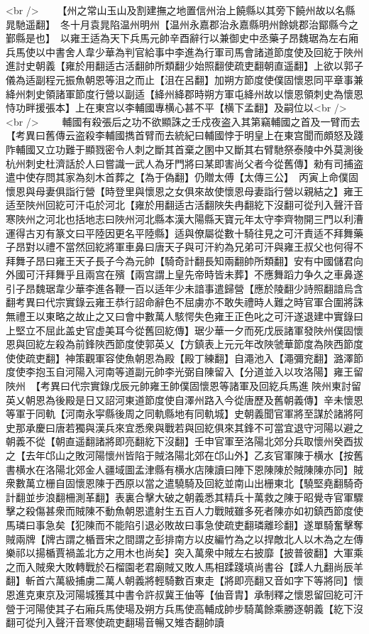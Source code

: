 <br />
　　【州之常山玉山及割建撫之地置信州治上饒縣以其旁下饒州故以名縣晁馳遥翻】　冬十月袁晁陷温州明州【温州永嘉郡治永嘉縣明州餘姚郡治鄮縣今之鄞縣是也】　以雍王适為天下兵馬元帥辛酉辭行以兼御史中丞藥子昂魏琚為左右廂兵馬使以中書舍人韋少華為判官給事中李進為行軍司馬會諸道節度使及回紇于陜州進討史朝義【雍於用翻适古活翻帥所類翻少始照翻使疏吏翻朝直遥翻】上欲以郭子儀為适副程元振魚朝恩等沮之而止【沮在呂翻】加朔方節度使僕固懷恩同平章事兼絳州刺史領諸軍節度行營以副适【絳州絳郡時朔方軍屯絳州故以懷恩領刺史為懷恩恃功畔援張本】上在東宫以李輔國專横心甚不平【横下孟翻】及嗣位以<br />
<br />
　　輔國有殺張后之功不欲顯誅之壬戍夜盗入其第竊輔國之首及一臂而去　【考異曰舊傳云盗殺李輔國擕首臂而去統紀曰輔國悖于明皇上在東宫聞而頗怒及踐阼輔國又立功難于顯戮密令人刺之斷其首棄之圂中又斷其右臂馳祭泰陵中外莫測後杭州刺史杜濟話於人曰嘗識一武人為牙門將曰某即害尚父者今從舊傳】勑有司捕盗遣中使存問其家為刻木首葬之【為于偽翻】仍贈太傅【太傳三公】　丙寅上命僕固懷恩與母妻俱詣行營【時登里與懷恩之女俱來故使懷恩母妻詣行營以親結之】雍王适至陜州回紇可汗屯於河北【雍於用翻适古活翻陜失冉翻紇下沒翻可從刋入聲汗音寒陜州之河北也括地志曰陜州河北縣本漢大陽縣天寶元年太守李齊物開三門以利漕運得古刃有篆文曰平陸因更名平陸縣】适與僚屬從數十騎往見之可汗責适不拜舞藥子昂對以禮不當然回紇將軍車鼻曰唐天子與可汗約為兄弟可汗與雍王叔父也何得不拜舞子昂曰雍王天子長子今為元帥【騎奇計翻長知兩翻帥所類翻】安有中國儲君向外國可汗拜舞乎且兩宫在殯【兩宫謂上皇先帝時皆未葬】不應舞蹈力争久之車鼻遂引子昂魏琚韋少華李進各鞭一百以适年少未諳事遣歸營【應於陵翻少詩照翻諳烏含翻考異曰代宗實錄云雍王恭行詔命辭色不屈虜亦不敢失禮時人難之時官軍合圍將誅無禮王以東略之故止之又曰會中數萬人駭愕失色雍王正色叱之可汗遂退建中實錄曰上堅立不屈此盖史官虚美耳今從舊回紇傳】琚少華一夕而死戊辰諸軍發陜州僕固懷恩與回紇左殺為前鋒陜西節度使郭英乂【方鎮表上元元年改陜虢華節度為陜西節度使使疏吏翻】神策觀軍容使魚朝恩為殿【殿丁練翻】自澠池入【澠彌兖翻】潞澤節度使李抱玉自河陽入河南等道副元帥李光弼自陳留入【分道並入以攻洛陽】雍王留陜州　【考異曰代宗實錄戊辰元帥雍王帥僕固懷恩等諸軍及回紇兵馬進陜州東討留英乂朝恩為後殿是日又詔河東道節度使自澤州路入今從唐歷及舊朝義傳】辛未懷恩等軍于同軌【河南永寜縣後周之同軌縣地有同軌城】史朝義聞官軍將至謀於諸將阿史那承慶曰唐若獨與漢兵來宜悉衆與戰若與回紇俱來其鋒不可當宜退守河陽以避之朝義不從【朝直遥翻諸將即亮翻紇下沒翻】壬申官軍至洛陽北郊分兵取懷州癸酉拔之【去年邙山之敗河陽懷州皆陷于賊洛陽北郊在邙山外】乙亥官軍陳于横水【按舊書横水在洛陽北郊金人疆域圖孟津縣有横水店陳讀曰陣下恩陳陳於賊陳陳亦同】賊衆數萬立栅自固懷恩陳于西原以當之遣驍騎及回紇並南山出栅東北【驍堅堯翻騎奇計翻並步浪翻柵測革翻】表裏合擊大破之朝義悉其精兵十萬救之陳于昭覺寺官軍驟擊之殺傷甚衆而賊陳不動魚朝恩遣射生五百人力戰賊雖多死者陳亦如初鎮西節度使馬璘曰事急矣【犯陳而不能陷引退必敗故曰事急使疏吏翻璘離珍翻】遂單騎奮擊奪賊兩牌【牌古謂之楯晋宋之間謂之彭排南方以皮編竹為之以捍敵北人以木為之左傳樂祁以揚楯賈禍盖北方之用木也尚矣】突入萬衆中賊左右披靡【披普彼翻】大軍乘之而入賊衆大敗轉戰於石榴園老君廟賊又敗人馬相蹂踐填尚書谷【蹂人九翻尚辰羊翻】斬首六萬級捕虜二萬人朝義將輕騎數百東走【將即亮翻又音如字下等將同】懷恩進克東京及河陽城獲其中書令許叔冀王伷等【伷音胄】承制釋之懷恩留回紇可汗營于河陽使其子右廂兵馬使瑒及朔方兵馬使高輔成帥步騎萬餘乘勝逐朝義【紇下沒翻可從刋入聲汗音寒使疏吏翻瑒音暢又雉杏翻帥讀